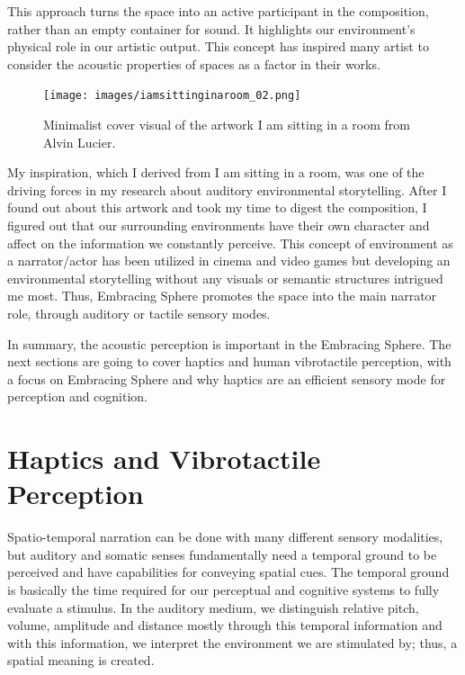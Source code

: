                 This approach turns the space into an active participant in the composition, rather than an empty container for sound. It highlights our environment's physical role in our artistic output. This concept has inspired many artist to consider the acoustic properties of spaces as a factor in their works\cite{Lucier_phd}.\par

                \begin{figure}[H]
                    \centering
                    \texttt{[image: images/iamsittinginaroom\_02.png]}
                    \caption{Minimalist cover visual of the artwork I am sitting in a room from Alvin Lucier.}
                    \label{fig:IASIAR_02}
                \end{figure}

                My inspiration, which I derived from I am sitting in a room, was one of the driving forces in my research about auditory environmental storytelling. After I found out about this artwork and took my time to digest the composition, I figured out that our surrounding environments have their own character and affect on the information we constantly perceive. This concept of environment as a narrator/actor has been utilized in cinema and video games but developing an environmental storytelling without any visuals or semantic structures intrigued me most. Thus, Embracing Sphere promotes the space into the main narrator role, through auditory or tactile sensory modes.\par
                
                In summary, the acoustic perception is important in the Embracing Sphere. The next sections are going to cover haptics and human vibrotactile perception, with a focus on Embracing Sphere and why haptics are an efficient sensory mode for perception and cognition.\par
    \section{Haptics and Vibrotactile Perception}
        Spatio-temporal narration can be done with many different sensory modalities, but auditory and somatic senses fundamentally need a temporal ground to be perceived and have capabilities for conveying spatial cues\cite{Haptic_Perception-A_Tutorial}. The temporal ground is basically the time required for our perceptual and cognitive systems to fully evaluate a stimulus\cite{Haptic_Perception-A_Tutorial}. In the auditory medium, we distinguish relative pitch, volume, amplitude and distance mostly through this temporal information and with this information, we interpret the environment we are stimulated by; thus, a spatial meaning is created.\cite{Haptic_Rendering}\par

